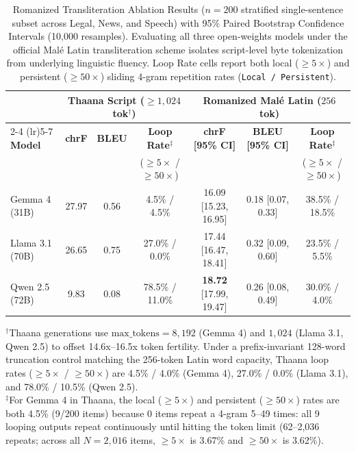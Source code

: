 \documentclass[acmsmall,review,anonymous]{acmart}
\begin{document}
\begin{table}[t]
\centering
\small
\setlength{\tabcolsep}{2.8pt}
\caption{Romanized Transliteration Ablation Results ($n=200$ stratified single-sentence subset across Legal, News, and Speech) with 95\% Paired Bootstrap Confidence Intervals (10,000 resamples). Evaluating all three open-weights models under the official Mal\'{e} Latin transliteration scheme isolates script-level byte tokenization from underlying linguistic fluency. Loop Rate cells report both local ($\ge 5\times$) and persistent ($\ge 50\times$) sliding 4-gram repetition rates (\texttt{Local / Persistent}).}
\label{tab:romanized_ablation}
\begin{tabular}{l ccc ccc}
\toprule
& \multicolumn{3}{c}{\textbf{Thaana Script ($\ge 1,024$ tok$^\dagger$)}} & \multicolumn{3}{c}{\textbf{Romanized Mal\'{e} Latin ($256$ tok)}} \\
\cmidrule(lr){2-4} \cmidrule(lr){5-7}
\textbf{Model} & \textbf{chrF} & \textbf{BLEU} & \textbf{Loop Rate$^\ddagger$} & \textbf{chrF [95\% CI]} & \textbf{BLEU [95\% CI]} & \textbf{Loop Rate$^\ddagger$} \\
& & & \footnotesize($\ge 5\times$ / $\ge 50\times$) & & & \footnotesize($\ge 5\times$ / $\ge 50\times$) \\
\midrule
Gemma 4 (31B) & 27.97 & 0.56 & 4.5\% / 4.5\% & 16.09 [15.23, 16.95] & 0.18 [0.07, 0.33] & 38.5\% / 18.5\% \\
Llama 3.1 (70B) & 26.65 & 0.75 & 27.0\% / 0.0\% & 17.44 [16.47, 18.41] & 0.32 [0.09, 0.60] & 23.5\% / 5.5\% \\
Qwen 2.5 (72B) & 9.83 & 0.08 & 78.5\% / 11.0\% & \textbf{18.72} [17.99, 19.47] & 0.26 [0.08, 0.49] & 30.0\% / 4.0\% \\
\bottomrule
\end{tabular}
\begin{flushleft}
\footnotesize
$^\dagger$Thaana generations use $\text{max\_tokens} = 8,192$ (Gemma 4) and $1,024$ (Llama 3.1, Qwen 2.5) to offset 14.6x--16.5x token fertility. Under a prefix-invariant 128-word truncation control matching the 256-token Latin word capacity, Thaana loop rates ($\ge 5\times$ / $\ge 50\times$) are 4.5\% / 4.0\% (Gemma 4), 27.0\% / 0.0\% (Llama 3.1), and 78.0\% / 10.5\% (Qwen 2.5).\\
$^\ddagger$For Gemma 4 in Thaana, the local ($\ge 5\times$) and persistent ($\ge 50\times$) rates are both 4.5\% (9/200 items) because 0 items repeat a 4-gram 5--49 times: all 9 looping outputs repeat continuously until hitting the token limit (62--2,036 repeats; across all $N=2,016$ items, $\ge 5\times$ is 3.67\% and $\ge 50\times$ is 3.62\%).
\end{flushleft}
\end{table}
\end{document}
